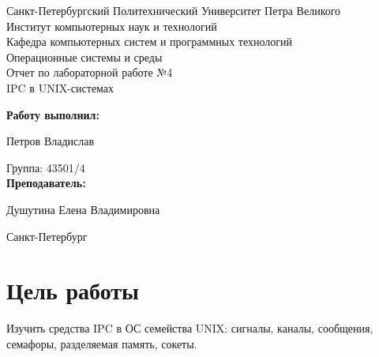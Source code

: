 \documentclass[a4paper]{article}
\begin{document}
\begin{titlepage} %

\begin{center} %

\large Санкт-Петербургский Политехнический Университет Петра Великого\\
\large Институт компьютерных наук и технологий \\
\large Кафедра компьютерных систем и программных технологий\\[6cm]

\huge Операционные системы и среды\\[0.5cm]
\large Отчет по лабораторной работе №4\\[0.1cm]
\large IPC в UNIX-системах\\[5cm]
\end{center}

\begin{flushright}
\begin{minipage}{0.5\textwidth}
\begin{flushright}
\textbf{Работу выполнил:}

Петров Владислав

{Группа:} 43501/4\\


\textbf{Преподаватель:} 

Душутина Елена Владимировна
\end{flushright}
\end{minipage} %
\end{flushright} %

\vfill %

\begin{center}

\large Санкт-Петербург\\
\large \the\year %

\end{center} %

\thispagestyle{empty} %
\end{titlepage} %

\vfill %

\section{Цель работы}
	Изучить средства IPC в ОС семейства UNIX: сигналы, каналы, сообщения, семафоры, разделяемая память, сокеты.
\end{document}
